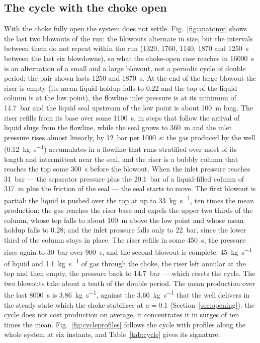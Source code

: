 \documentclass[a4paper,fleqn]{cas-sc}
\begin{document}
\subsection{The cycle with the choke open}\label{sec:anatomy}

With the choke fully open the system does not settle. Fig.~\ref{fig:anatomy} shows the last two blowouts of the run: the blowouts alternate in size, but the intervals between them do not repeat within the run (1320, 1760, 1140, 1870 and \SI{1250}{\second} between the last six blowdowns), so what the choke-open case reaches in \SI{16000}{\second} is an alternation of a small and a large blowout, not a periodic cycle of double period; the pair shown lasts 1250 and \SI{1870}{\second}. At the end of the large blowout the riser is empty (its mean liquid holdup falls to 0.22 and the top of the liquid column is at the low point), the flowline inlet pressure is at its minimum of \SI{14.7}{\bar} and the liquid seal upstream of the low point is about \SI{100}{\metre} long. The riser refills from its base over some \SI{1100}{\second}, in steps that follow the arrival of liquid slugs from the flowline, while the seal grows to \SI{360}{\metre} and the inlet pressure rises almost linearly, by \SI{12}{\bar} per \SI{1000}{\second}: the gas produced by the well (\SI{0.12}{\kilogram\per\second}) accumulates in a flowline that runs stratified over most of its length and intermittent near the seal, and the riser is a bubbly column that reaches the top some \SI{300}{\second} before the blowout. When the inlet pressure reaches \SI{31}{\bar} --- the separator pressure plus the \SI{20.1}{\bar} of a liquid-filled column of \SI{317}{\metre} plus the friction of the seal --- the seal starts to move. The first blowout is partial: the liquid is pushed over the top at up to \SI{33}{\kilogram\per\second}, ten times the mean production; the gas reaches the riser base and expels the upper two thirds of the column, whose top falls to about \SI{100}{\metre} above the low point and whose mean holdup falls to 0.28; and the inlet pressure falls only to \SI{22}{\bar}, since the lower third of the column stays in place. The riser refills in some \SI{450}{\second}, the pressure rises again to \SI{30}{\bar} over \SI{900}{\second}, and the second blowout is complete: \SI{45}{\kilogram\per\second} of liquid and \SI{1.1}{\kilogram\per\second} of gas through the choke, the riser left annular at the top and then empty, the pressure back to \SI{14.7}{\bar} --- which resets the cycle. The two blowouts take about a tenth of the double period. The mean production over the last \SI{8000}{\second} is \SI{3.86}{\kilogram\per\second}, against the \SI{3.60}{\kilogram\per\second} that the well delivers in the steady state which the choke stabilises at $a = 0.1$ (Section~\ref{sec:opening}): the cycle does not cost production on average, it concentrates it in surges of ten times the mean. Fig.~\ref{fig:cycleprofiles} follows the cycle with profiles along the whole system at six instants, and Table~\ref{tab:cycle} gives its signature.
\end{document}
